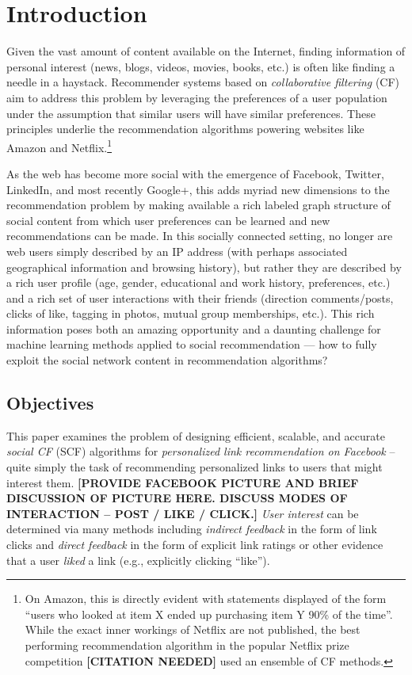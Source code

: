 \documentclass{sig-alternate}
\begin{document}
\section{Introduction}

Given the vast amount of content available on the Internet, finding
information of personal interest (news, blogs, videos, movies, books,
etc.) is often like finding a needle in a haystack.  Recommender
systems based on \emph{collaborative filtering} (CF) aim to address
this problem by leveraging the preferences of a user
population under the assumption that similar users
will have similar preferences.  These principles underlie the
recommendation algorithms powering websites like Amazon and
Netflix.\footnote{On Amazon, this is directly evident with statements
displayed of the form ``users who looked at item X ended up purchasing
item Y 90\% of the time''.  While the exact inner workings of Netflix
are not published, the best performing recommendation algorithm in
the popular Netflix prize competition {\bf [CITATION NEEDED]} 
used an ensemble of CF methods.}

As the web has become more social with the emergence of Facebook,
Twitter, LinkedIn, and most recently Google+, this adds myriad new
dimensions to the recommendation problem by making available a rich
labeled graph structure of social content from which user preferences
can be learned and new recommendations can be made.  In this socially
connected setting, no longer are web users simply described by an IP
address (with perhaps associated geographical information and browsing
history), but rather they are described by a rich user profile (age,
gender, educational and work history, preferences, etc.)  and a rich
set of user interactions with their friends (direction comments/posts,
clicks of like, tagging in photos, mutual group memberships, etc.).
This rich information poses both an amazing opportunity and a daunting
challenge for machine learning methods applied to social
recommendation --- how to fully exploit the social network content in
recommendation algorithms?

\subsection{Objectives}

This paper examines the problem of designing efficient, scalable, and
accurate \emph{social CF} (SCF) algorithms for \emph{personalized link
recommendation on Facebook} -- quite simply the task of recommending
personalized links to users that might interest them.  {\bf [PROVIDE
FACEBOOK PICTURE AND BRIEF DISCUSSION OF PICTURE HERE.  DISCUSS
MODES OF INTERACTION -- POST / LIKE / CLICK.]}  \emph{User
interest} can be determined via many methods including \emph{indirect
feedback} in the form of link clicks and \emph{direct feedback} in the form of
explicit link ratings or other evidence that a user \emph{liked}
a link (e.g., explicitly clicking ``like'').
\end{document}

